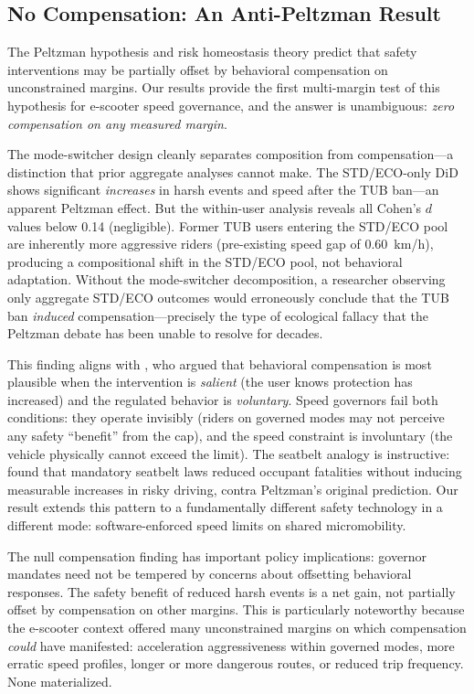 \subsection{No Compensation: An Anti-Peltzman Result}
\label{sec:disc_peltzman}

The Peltzman hypothesis \citep{peltzman1975effects} and risk homeostasis theory \citep{wilde1982theory} predict that safety interventions may be partially offset by behavioral compensation on unconstrained margins. Our results provide the first multi-margin test of this hypothesis for e-scooter speed governance, and the answer is unambiguous: \textit{zero compensation on any measured margin}.

The mode-switcher design cleanly separates composition from compensation---a distinction that prior aggregate analyses cannot make. The STD/ECO-only DiD shows significant \textit{increases} in harsh events and speed after the TUB ban---an apparent Peltzman effect. But the within-user analysis reveals all Cohen's $d$ values below 0.14 (negligible). Former TUB users entering the STD/ECO pool are inherently more aggressive riders (pre-existing speed gap of 0.60~km/h), producing a compositional shift in the STD/ECO pool, not behavioral adaptation. Without the mode-switcher decomposition, a researcher observing only aggregate STD/ECO outcomes would erroneously conclude that the TUB ban \textit{induced} compensation---precisely the type of ecological fallacy that the Peltzman debate has been unable to resolve for decades.

This finding aligns with \citet{hedlund2000risky}, who argued that behavioral compensation is most plausible when the intervention is \textit{salient} (the user knows protection has increased) and the regulated behavior is \textit{voluntary}. Speed governors fail both conditions: they operate invisibly (riders on governed modes may not perceive any safety ``benefit'' from the cap), and the speed constraint is involuntary (the vehicle physically cannot exceed the limit). The seatbelt analogy is instructive: \citet{cohen2003effects} found that mandatory seatbelt laws reduced occupant fatalities without inducing measurable increases in risky driving, contra Peltzman's original prediction. Our result extends this pattern to a fundamentally different safety technology in a different mode: software-enforced speed limits on shared micromobility.

The null compensation finding has important policy implications: governor mandates need not be tempered by concerns about offsetting behavioral responses. The safety benefit of reduced harsh events is a net gain, not partially offset by compensation on other margins. This is particularly noteworthy because the e-scooter context offered many unconstrained margins on which compensation \textit{could} have manifested: acceleration aggressiveness within governed modes, more erratic speed profiles, longer or more dangerous routes, or reduced trip frequency. None materialized.

